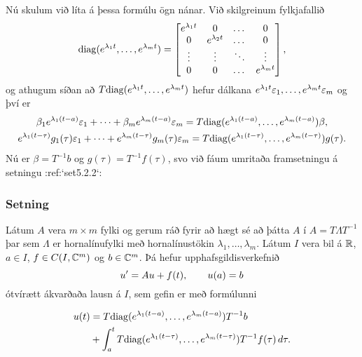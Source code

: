 Nú skulum við líta á þessa formúlu ögn nánar.  Við skilgreinum  fylkjafallið
$${\operatorname{diag}}(e^{\lambda_1t},\dots,e^{\lambda_mt})=
\left[\begin{matrix}
e\sp{\lambda_1t}&0&\dots&0\\
0&e\sp{\lambda_2t}&\dots&0\\
\vdots&\vdots&\ddots&\vdots\\
0&0&\dots&e^{\lambda_mt}
\end{matrix}\right],
$$
og athugum síðan að $T{\operatorname{diag}}(e^{\lambda_1t},\dots,e^{\lambda_mt})$ 
hefur dálkana
$e\sp{\lambda_1t}\varepsilon_1,\dots,e\sp{\lambda_mt}\varepsilon_m$ og því
er 
\begin{gather*}
\beta_1e^{\lambda_1(t-a)}\varepsilon_1+
\cdots+\beta_me^{\lambda_m(t-a)}\varepsilon_m=
T{\operatorname{diag}}(e^{\lambda_1(t-a)},\dots,e^{\lambda_m(t-a)})\beta,\\
e^{\lambda_1(t-\tau)}g_1(\tau)\varepsilon_1
+\cdots+
e^{\lambda_m(t-\tau)}g_m(\tau)\varepsilon_m=
T{\operatorname{diag}}(e^{\lambda_1(t-\tau)},\dots,e^{\lambda_m(t-\tau)})g(\tau).
\end{gather*}
Nú er $\beta=T^{-1}b$ og $g(\tau)=T^{-1}f(\tau)$, svo við fáum umritaða
framsetningu á setningu :ref:`set5.2.2`:

\subsubsection{Setning}
Látum $A$ vera $m\times m$ fylki og gerum ráð fyrir að hægt sé að
þátta $A$ í $A=T\Lambda T^{-1}$ þar sem $\Lambda $ er hornalínufylki með
hornalínustökin $\lambda_1,\dots,\lambda_m$.  Látum $I$ vera bil á
${\mathbb R}$, $a\in I$, $f\in C(I,{\mathbb C}^m)$ og $b\in {\mathbb C}^m$.  Þá hefur
upphafsgildisverkefnið  $$u{\sp{\prime}}=Au+f(t), \qquad u(a)=b
 $$
ótvírætt ákvarðaða lausn á $I$, sem gefin er með formúlunni
 
\begin{align*}
u(t)&=T{\operatorname{diag}}(e^{\lambda_1(t-a)},\dots,e^{\lambda_m(t-a)})T^{-1}b\\
&+\int_a^t T{\operatorname{diag}}(e^{\lambda_1(t-\tau)},\dots,e^{\lambda_m(t-\tau)})
T^{-1}f(\tau)\, d\tau.
\end{align*}
 


